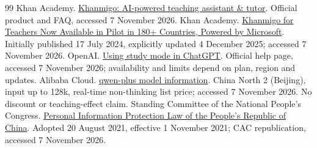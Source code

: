 \begin{thebibliography}{99}
 Khan Academy. \href{https://khanmigo.ai/}{Khanmigo: AI-powered teaching assistant \& tutor}. Official product and FAQ, accessed 7 November 2026.
 Khan Academy. \href{https://blog.khanacademy.org/teachers-in-44-countries-now-get-free-access-to-khanmigo-in-english-thanks-to-microsoft-support/}{Khanmigo for Teachers Now Available in Pilot in 180+ Countries, Powered by Microsoft}. Initially published 17 July 2024, explicitly updated 4 December 2025; accessed 7 November 2026.
 OpenAI. \href{https://help.openai.com/en/articles/11780217-using-study-mode-in-chatgpt}{Using study mode in ChatGPT}. Official help page, accessed 7 November 2026; availability and limits depend on plan, region and updates.
 Alibaba Cloud. \href{https://help.aliyun.com/zh/model-studio/qwen-plus}{qwen-plus model information}. China North 2 (Beijing), input up to 128k, real-time non-thinking list price; accessed 7 November 2026. No discount or teaching-effect claim.
 Standing Committee of the National People's Congress. \href{https://www.cac.gov.cn/2021-08/20/c_1631050028355286.htm}{Personal Information Protection Law of the People's Republic of China}. Adopted 20 August 2021, effective 1 November 2021; CAC republication, accessed 7 November 2026.

\end{thebibliography}
